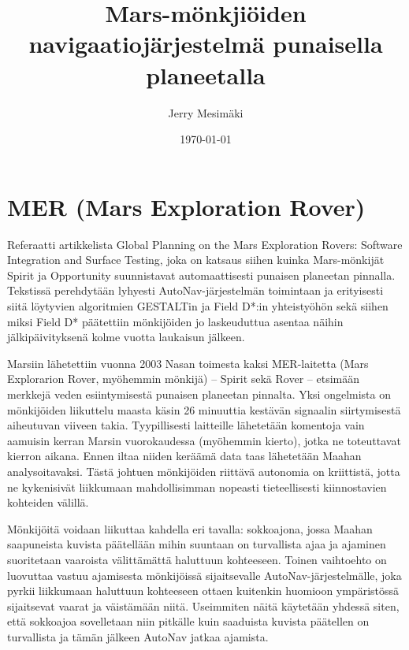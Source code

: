 \documentclass[finnish]{tktltiki2}
\title{Mars-mönkjiöiden navigaatiojärjestelmä punaisella planeetalla}
\author{Jerry Mesimäki}
\date{\today}
\theoremstyle{definition}
\theoremstyle{remark}
\begin{document}

\frontmatter      %

\maketitle        %
\makeabstract     %

\tableofcontents  %


\mainmatter       %

\section{MER (Mars Exploration Rover)}
Referaatti artikkelista Global Planning on the Mars Exploration Rovers: Software Integration and Surface Testing, joka on katsaus siihen kuinka Mars-mönkijät Spirit ja Opportunity suunnistavat automaattisesti punaisen planeetan pinnalla. Tekstissä perehdytään lyhyesti AutoNav-järjestelmän toimintaan ja erityisesti siitä löytyvien algoritmien GESTALTin ja Field D*:in yhteistyöhön sekä siihen miksi Field D* päätettiin mönkijöiden jo laskeuduttua asentaa näihin jälkipäivityksenä kolme vuotta laukaisun jälkeen.

Marsiin lähetettiin vuonna 2003 Nasan toimesta kaksi MER-laitetta (Mars Explorarion Rover, myöhemmin mönkijä) – Spirit sekä Rover – etsimään merkkejä veden esiintymisestä punaisen planeetan pinnalta. Yksi ongelmista on mönkijöiden liikuttelu maasta käsin 26 minuuttia kestävän signaalin siirtymisestä aiheutuvan viiveen takia. Tyypillisesti laitteille lähetetään komentoja vain aamuisin kerran Marsin vuorokaudessa (myöhemmin kierto), jotka ne toteuttavat kierron aikana. Ennen iltaa niiden keräämä data taas lähetetään Maahan analysoitavaksi. Tästä johtuen mönkijöiden riittävä autonomia on kriittistä, jotta ne kykenisivät liikkumaan mahdollisimman nopeasti tieteellisesti kiinnostavien kohteiden välillä.

Mönkijöitä voidaan liikuttaa kahdella eri tavalla: sokkoajona, jossa Maahan saapuneista kuvista päätellään mihin suuntaan on turvallista ajaa ja ajaminen suoritetaan vaaroista välittämättä haluttuun kohteeseen. Toinen vaihtoehto on luovuttaa vastuu ajamisesta mönkijöissä sijaitsevalle AutoNav-järjestelmälle, joka pyrkii liikkumaan haluttuun kohteeseen ottaen kuitenkin huomioon ympäristössä sijaitsevat vaarat ja väistämään niitä. Useimmiten näitä käytetään yhdessä siten, että sokkoajoa sovelletaan niin pitkälle kuin saaduista kuvista päätellen on turvallista ja tämän jälkeen AutoNav jatkaa ajamista.
\end{document}
